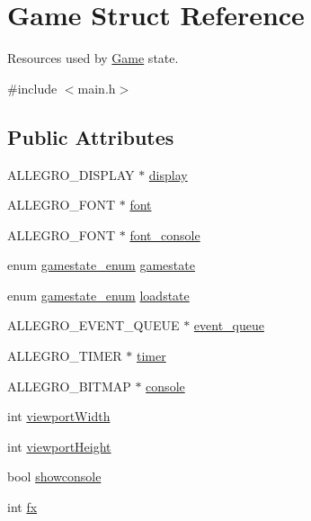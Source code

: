 \hypertarget{structGame}{\section{Game Struct Reference}
\label{structGame}
}


Resources used by \hyperlink{structGame}{Game} state.  




{\ttfamily \#include $<$main.\-h$>$}

\subsection*{Public Attributes}
\begin{DoxyCompactItemize}
\item 
A\-L\-L\-E\-G\-R\-O\-\_\-\-D\-I\-S\-P\-L\-A\-Y $\ast$ \hyperlink{structGame_a2bf8ece79fe05b03c31f2e2ede42e5f5}{display}
\item 
A\-L\-L\-E\-G\-R\-O\-\_\-\-F\-O\-N\-T $\ast$ \hyperlink{structGame_a455bfdaacd5f2bda80b640c02ec3250e}{font}
\item 
A\-L\-L\-E\-G\-R\-O\-\_\-\-F\-O\-N\-T $\ast$ \hyperlink{structGame_a692f2c3ec0f3e956aa8bdac00a864bf8}{font\-\_\-console}
\item 
enum \hyperlink{main_8h_ae1e9f94402d151ae1adc212237a6d153}{gamestate\-\_\-enum} \hyperlink{structGame_a5118a01ee6bb74fb41e8e8880a5b85a2}{gamestate}
\item 
enum \hyperlink{main_8h_ae1e9f94402d151ae1adc212237a6d153}{gamestate\-\_\-enum} \hyperlink{structGame_a026bb8ebb6454c0d87dea503eafa9197}{loadstate}
\item 
A\-L\-L\-E\-G\-R\-O\-\_\-\-E\-V\-E\-N\-T\-\_\-\-Q\-U\-E\-U\-E $\ast$ \hyperlink{structGame_a820782e408ff7a704dc12af67eb0c44f}{event\-\_\-queue}
\item 
A\-L\-L\-E\-G\-R\-O\-\_\-\-T\-I\-M\-E\-R $\ast$ \hyperlink{structGame_a8d6d4f06c6412d085112cd007977d868}{timer}
\item 
A\-L\-L\-E\-G\-R\-O\-\_\-\-B\-I\-T\-M\-A\-P $\ast$ \hyperlink{structGame_aa2e3d0922374dc870a1aeabf9e3b8ae2}{console}
\item 
int \hyperlink{structGame_aea50dd6aa55c0d5bbd42dcb38e433a71}{viewport\-Width}
\item 
int \hyperlink{structGame_a3e8d2e824fc4de63e936c4b0bcf071f3}{viewport\-Height}
\item 
bool \hyperlink{structGame_ab1dafa4ce0c3526439418ac24bf616d8}{showconsole}
\item 
int \hyperlink{structGame_a10c0e81918f42e7367b4590e6885048e}{fx}

\end{DoxyCompactItemize}
